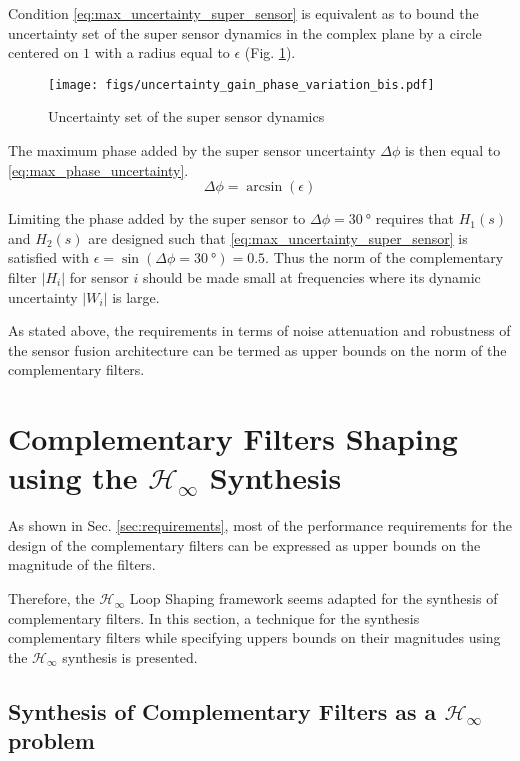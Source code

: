 \documentclass[letterpaper, 10 pt, conference]{ieeeconf}
\begin{document}
Condition \eqref{eq:max_uncertainty_super_sensor} is equivalent as to bound the uncertainty set of the super sensor dynamics in the complex plane by a circle centered on \(1\) with a radius equal to \(\epsilon\) (Fig. \ref{fig:uncertainty_gain_phase_variation_bis}).

\begin{figure}[htbp]
\centering
\texttt{[image: figs/uncertainty\_gain\_phase\_variation\_bis.pdf]}
\caption{\label{fig:uncertainty_gain_phase_variation_bis}
Uncertainty set of the super sensor dynamics}
\end{figure}

The maximum phase added by the super sensor uncertainty \(\Delta\phi\) is then equal to \eqref{eq:max_phase_uncertainty}.
\begin{equation}
\label{eq:max_phase_uncertainty}
    \Delta \phi = \arcsin\left( \epsilon \right)
\end{equation}

Limiting the phase added by the super sensor to \(\Delta \phi = \SI{30}{\degree}\) requires that \(H_1(s)\) and \(H_2(s)\) are designed such that \eqref{eq:max_uncertainty_super_sensor} is satisfied with \(\epsilon = \sin(\Delta\phi = \SI{30}{\degree}) = 0.5\).
Thus the norm of the complementary filter \(|H_i|\) for sensor \(i\) should be made small at frequencies where its dynamic uncertainty \(|W_i|\) is large.\par

As stated above, the requirements in terms of noise attenuation and robustness of the sensor fusion architecture can be termed as upper bounds on the norm of the complementary filters.

\section{Complementary Filters Shaping using the \(\mathcal{H}_\infty\) Synthesis}
\label{sec:orgb8fb6f7}
\label{sec:hinf_method}
As shown in Sec. \ref{sec:requirements}, most of the performance requirements for the design of the complementary filters can be expressed as upper bounds on the magnitude of the filters.

Therefore, the \(\mathcal{H}_\infty\) Loop Shaping framework seems adapted for the synthesis of complementary filters.
In this section, a technique for the synthesis complementary filters while specifying uppers bounds on their magnitudes using the \(\mathcal{H}_\infty\) synthesis is presented.
\subsection{Synthesis of Complementary Filters as a \(\mathcal{H}_\infty\) problem}
\label{sec:org3375829}
\label{sec:hinf_synthesis}
\end{document}

